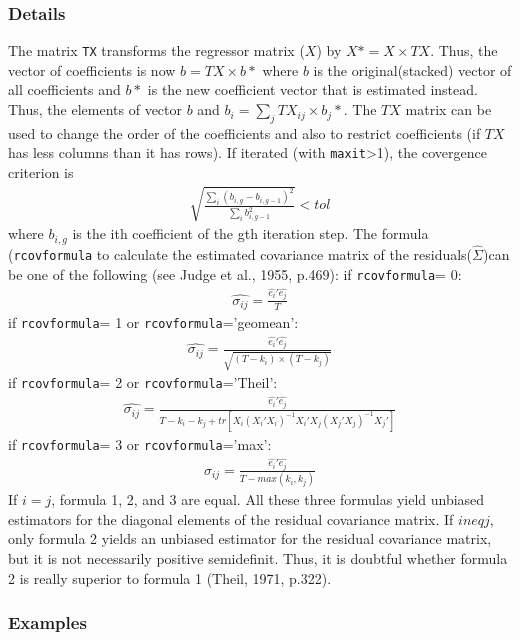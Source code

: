 \documentclass[12pt]{book}%
\begin{document}
\subsubsection{Details}
The matrix \texttt{TX} transforms the regressor matrix ($X$) by $X\ast=X \times TX$. Thus,
the vector of coefficients is now $b=TX \times b\ast$ where $b$ is the original(stacked) 
vector of all coefficients and $b\ast$ is the new coefficient vector that is estimated instead.
Thus, the elements of vector $b$ and $b_i = \sum_j TX_{ij}\times b_j\ast$. The $TX$ matrix can be
used to change the order of the coefficients and also to restrict coefficients (if $TX$ has 
less columns than it has rows). 
If iterated (with \texttt{maxit}>1), the covergence criterion is
\begin{eqnarray*}
\sqrt{\frac{\sum_i(b_{i,g}-b_{i,g-1})^2}{\sum_ib_{i,g-1}^2}}< tol
\end{eqnarray*}
where $b_{i,g}$ is the ith coefficient of the gth iteration step.
The formula (\texttt{rcovformula} to calculate the estimated covariance matrix of the residuals($\hat{\Sigma}$)can be one
of the following (see Judge et al., 1955, p.469):
if \texttt{rcovformula}= 0:
\begin{eqnarray*}
\hat{\sigma_{ij}}= \frac{\hat{e_i}\prime\hat{e_j}}{T}
\end{eqnarray*}
if \texttt{rcovformula}= 1 or \texttt{rcovformula}='geomean':
\begin{eqnarray*}
\hat{\sigma_{ij}}= \frac{\hat{e_i}\prime\hat{e_j}}{\sqrt{(T-k_i)\times (T-k_j)}}
\end{eqnarray*}
if \texttt{rcovformula}= 2 or \texttt{rcovformula}='Theil':
\begin{eqnarray*}
\hat{\sigma_{ij}}= \frac{\hat{e_i}\prime\hat{e_j}}{T-k_i-k_j+tr[X_i(X_i\prime X_i)^{-1}X_i\prime X_j(X_j\prime X_j)^{-1}X_j\prime]}
\end{eqnarray*}
if \texttt{rcovformula}= 3 or \texttt{rcovformula}='max':
\begin{eqnarray*}
\hat{\sigma_{ij}}= \frac{\hat{e_i}\prime\hat{e_j}}{T-max(k_i,k_j)}
\end{eqnarray*}
If $i = j$, formula 1, 2, and 3 are equal. All these three formulas yield unbiased estimators
for the diagonal elements of the residual covariance matrix. If $i neq j$, only formula 2
yields an unbiased estimator for the residual covariance matrix, but it is not necessarily
positive semidefinit. Thus, it is doubtful whether formula 2 is really superior to formula 1
(Theil, 1971, p.322).
\subsubsection{Examples}
\end{document}
